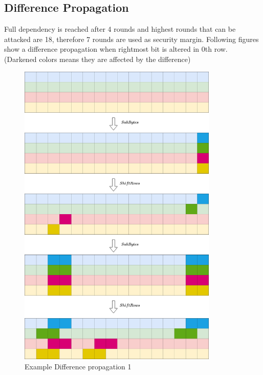 \documentclass[final]{transcrypto}
\begin{document}
\subsection{Difference Propagation}
Full dependency is reached after 4 rounds and highest rounds that can be attacked are 18, therefore 7 rounds are used as security margin. Following figures show a difference propagation when rightmost bit is altered in 0th row. (Darkened colors means they are affected by the difference)
\newpage
\begin{figure}[H]
\caption{Example Difference propagation 1}
\centering
\includegraphics[width=0.85\textwidth]{images/diff_prop1_xor.png}
\end{figure}
\end{document}
